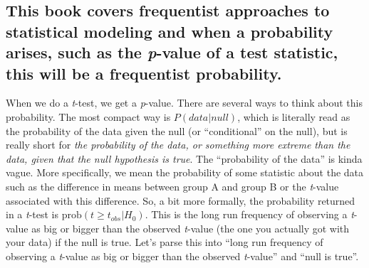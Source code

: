 \documentclass[]{book}
\begin{document}
\subsection{\texorpdfstring{This book covers frequentist approaches to
statistical modeling and when a probability arises, such as the
\emph{p}-value of a test statistic, this will be a frequentist
probability.}{This book covers frequentist approaches to statistical modeling and when a probability arises, such as the p-value of a test statistic, this will be a frequentist probability.}}\label{this-book-covers-frequentist-approaches-to-statistical-modeling-and-when-a-probability-arises-such-as-the-p-value-of-a-test-statistic-this-will-be-a-frequentist-probability.}

When we do a \emph{t}-test, we get a \emph{p}-value. There are several
ways to think about this probability. The most compact way is
\(P(data | null)\), which is literally read as the probability of the
data given the null (or ``conditional'' on the null), but is really
short for \emph{the probability of the data, or something more extreme
than the data, given that the null hypothesis is true}. The
``probability of the data'' is kinda vague. More specifically, we mean
the probability of some statistic about the data such as the difference
in means between group A and group B or the \emph{t}-value associated
with this difference. So, a bit more formally, the probability returned
in a \emph{t}-test is \(\mathrm{prob}(t \ge t_{obs} | H_0)\). This is
the long run frequency of observing a \emph{t}-value as big or bigger
than the observed \emph{t}-value (the one you actually got with your
data) if the null is true. Let's parse this into ``long run frequency of
observing a \emph{t}-value as big or bigger than the observed
\emph{t}-value'' and ``null is true''.
\end{document}
